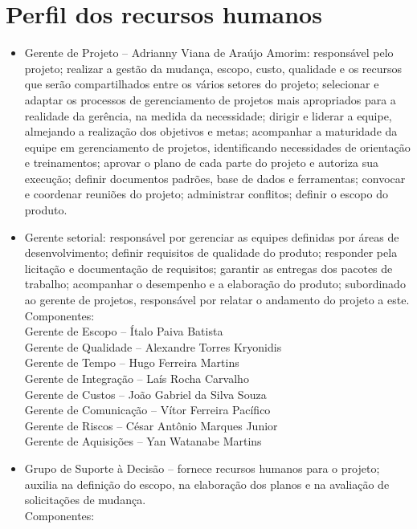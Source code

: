   \section*{Perfil dos recursos humanos}
  \begin{itemize}
   \item Gerente de Projeto – Adrianny Viana de Araújo Amorim: responsável pelo projeto; realizar a gestão da mudança, escopo, custo, qualidade e os recursos que serão compartilhados entre os vários setores do projeto; selecionar e adaptar os processos de gerenciamento de projetos mais apropriados para a realidade da gerência, na medida da necessidade; dirigir e liderar a equipe, almejando a realização dos objetivos e metas; acompanhar a maturidade da equipe em gerenciamento de projetos, identificando necessidades de orientação e treinamentos; aprovar o plano de cada parte do projeto e autoriza sua execução; definir documentos padrões, base de dados e ferramentas; convocar e coordenar reuniões do projeto; administrar conflitos; definir o escopo do produto.
   \item Gerente setorial: responsável por gerenciar as equipes definidas por áreas de desenvolvimento; definir requisitos de qualidade do produto; responder pela licitação e documentação de requisitos; garantir as entregas dos pacotes de trabalho; acompanhar o desempenho e a elaboração do produto; subordinado ao gerente de projetos, responsável por relatar o andamento do projeto a este.\\
Componentes:\\
Gerente de Escopo – Ítalo Paiva Batista\\
Gerente de Qualidade – Alexandre Torres Kryonidis\\
Gerente de Tempo – Hugo Ferreira Martins\\
Gerente de Integração – Laís Rocha Carvalho \\
Gerente de Custos – João Gabriel da Silva Souza\\
Gerente de Comunicação – Vítor Ferreira Pacífico \\
Gerente de Riscos – César Antônio Marques Junior \\
Gerente de Aquisições – Yan Watanabe Martins\\
  \item Grupo de Suporte à Decisão – fornece recursos humanos para o projeto; auxilia na definição do escopo, na elaboração dos planos e na avaliação de solicitações de mudança.\\
  Componentes: \\

\end{itemize}
